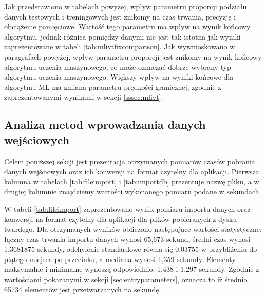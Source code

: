 Jak przedstawiono w tabelach powyżej, wpływ parametru proporcji podziału danych testowych i treningowych jest znikomy na czas trwania, precyzję i obciążenie pamięciowe. Wartość tego parametru ma wpływ na wynik końcowy algorytmu, jednak różnica pomiędzy danymi nie jest tak istotna jak wyniki zaprezentowane w tabeli \ref{tab:mlivtfixcomparison}. 
Jak wywnioskowano w paragrafach powyżej, wpływ parametru proporcji jest znikomy na wynik końcowy algorytmu uczenia maszynowego, co może oznaczać dobrze wybrany typ algorytmu uczenia maszynowego. Większy wpływ na wyniki końcowe dla algorytmu ML ma zmiana parametru prędkości granicznej, zgodnie z zaprezentowanymi wynikami w sekcji \ref{sssec:mlivt}.
\subsection{Analiza metod wprowadzania danych wejściowych}
\label{ssec:entrydata}
Celem poniższej sekcji jest prezentacja otrzymanych pomiarów czasów pobrania danych wejściowych oraz ich konwersji na format czytelny dla aplikacji. Pierwsza kolumna w tabelach \ref{tab:fileimport} i \ref{tab:importdb} prezentuje nazwę pliku, a w drugiej kolumnie znajdziemy wartości wykonanego pomiaru podane w sekundach.\par
W tabeli \ref{tab:fileimport} zaprezentowano wynik pomiaru importu danych oraz konwersji na format czytelny dla aplikacji dla plików pobieranych z dysku twardego. Dla otrzymanych wyników obliczono następujące wartości statystyczne: łączny czas trwania importu danych wynosi 65,673 sekund, średni czas wynosi 1,3681875 sekundy, odchylenie standardowe równa się 0,03755 w przybliżeniu do piątego miejsca po przecinku, a mediana wynosi 1,359 sekundy. Elementy maksymalne i minimalne wynoszą odpowiednio: 1,438 i
1,297 sekundy. Zgodnie z wartościami pokazanymi w sekcji \ref{sec:entryparameters}, oznacza to iż średnio 65734 elementów jest przetwarzanych na sekundę.
